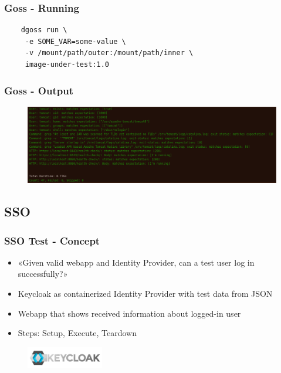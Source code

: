 \documentclass[14pt,aspectratio=169]{beamer}
\begin{document}
\begin{frame}[fragile]
  \frametitle{Goss - Running}
  \begin{verbatim}
    dgoss run \
     -e SOME_VAR=some-value \
     -v /mount/path/outer:/mount/path/inner \
     image-under-test:1.0
  \end{verbatim}
\end{frame}

\begin{frame}[fragile]
  \frametitle{Goss - Output}
  \begin{figure}
    \includegraphics[width=\textwidth]{images/goss.png}
  \end{figure}
\end{frame}


\subsection{SSO}

\begin{frame}
  \frametitle{SSO Test - Concept} 
  \begin{itemize}
    \item «Given valid webapp and Identity Provider, can a test user log in successfully?»
    \item Keycloak as containerized Identity Provider with test data from JSON
    \item Webapp that shows received information about logged-in user
    \item Steps: Setup, Execute, Teardown
  \end{itemize}
  \begin{figure}
    \includegraphics[width=0.3\textwidth]{images/keycloak_logo.png}
  \end{figure}
\end{frame}
\end{document}
